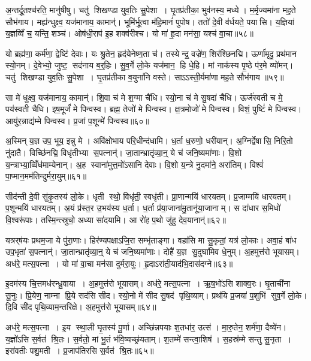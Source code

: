 अ॒न्तर्दू॒तश्च॑रति॒ मानु॑षीषु। चतु॑ शिखण्डा युव॒तिः सु॒पेशा। घृ॒तप्र॑तीका॒ भुव॑नस्य॒ मध्ये। म॒र्मृ॒ज्यमा॑ना मह॒ते सौभ॑गाय। मह्य॑न्धुक्ष्व॒ यज॑मानाय॒ कामान्॑। भूमि॑र्भू॒त्वा म॑हि॒मानं॑ पुपोष। ततो॑ दे॒वी व॑र्धयते॒ पयासि। य॒ज्ञिया॑ य॒ज्ञव्विँ च॒ यन्ति॒ शञ्च॑। ओष॑धी॒राप॑ इ॒ह शक्व॑रीश्च। यो मा॑ हृ॒दा मन॑सा॒ यश्च॑ वा॒चा॥५८॥

यो ब्रह्म॑णा॒ कर्म॑णा॒ द्वेष्टि॑ देवाः। यः श्रु॒तेन॒ हृद॑येनेष्ण॒ता च॑। तस्येन्द्र॒ वज्रे॑ण॒ शिर॑श्छिनद्मि। ऊर्णा॑मृदु॒ प्रथ॑मान स्यो॒नम्। दे॒वेभ्यो॒ जुष्ट॒ सद॑नाय ब॒र्॒हिः। सु॒व॒र्गे लो॒के यज॑मान॒ हि धे॒हि। मां नाक॑स्य पृ॒ष्ठे प॑र॒मे व्यो॑मन्। चतु॑ शिखण्डा युव॒तिः सु॒पेशा। घृ॒तप्र॑तीका व॒युना॑नि वस्ते। साऽऽस्ती॒र्यमा॑णा मह॒ते सौभ॑गाय ॥५९॥

सा मे॑ धुक्ष्व॒ यज॑मानाय॒ कामान्॑। शि॒वा च॑ मे श॒ग्मा चै॑धि। स्यो॒ना च॑ मे सु॒षदा॑ चैधि। ऊर्ज॑स्वती च मे॒ पय॑स्वती चैधि। इष॒मूर्जं॑ मे पिन्वस्व। ब्रह्म॒ तेजो॑ मे पिन्वस्व। क्ष॒त्रमोजो॑ मे पिन्वस्व। विशं॒ पुष्टिं॑ मे पिन्वस्व। आयु॑र॒न्नाद्य॑म्मे पिन्वस्व। प्र॒जां प॒शून्मे॑ पिन्वस्व॥६०॥

अ॒स्मिन् य॒ज्ञ उप॒ भूय॒ इन्नु मे। अवि॑क्षोभाय परि॒धीन्द॑धामि। ध॒र्ता ध॒रुणो॒ धरी॑यान्। अ॒ग्निर्द्वेषासि॒ निरि॒तो नु॑दातै। विच्छि॑नद्मि॒ विधृ॑तीभ्या स॒पत्नान्॑। जा॒तान्भ्रातृ॑व्या॒न्॒ ये च॑ जनि॒ष्यमा॑णाः। वि॒शो य॒न्त्राभ्या॒व्विँध॑माम्येनान्। अ॒ह स्वाना॑मुत्त॒मो॑ऽसानि देवाः। वि॒शो य॒न्त्रे नु॒दमा॑ने॒ अरा॑तिम्। विश्वं॑ पा॒प्मान॒मम॑तिन्दुर्मरा॒युम्॥६१॥

सीद॑न्ती दे॒वी सु॑कृ॒तस्य॑ लो॒के। धृती स्थो॒ विधृ॑ती॒ स्वधृ॑ती। प्रा॒णान्मयि॑ धारयतम्। प्र॒जाम्मयि॑ धारयतम्। प॒शून्मयि॑ धारयतम्। अ॒यं प्र॑स्त॒र उ॒भय॑स्य ध॒र्ता। ध॒र्ता प्र॑या॒जाना॑मु॒तानू॑या॒जानाम्। स दा॑धार स॒मिधो॑ वि॒श्वरू॑पाः। तस्मि॒न्त्स्रुचो॒ अध्या सा॑दयामि। आ रो॑ह प॒थो जु॑हु देव॒यानान्॑॥६२॥

यत्रर्‌ष॑यः प्रथम॒जा ये पु॑रा॒णाः। हिर॑ण्यपक्षाऽजि॒रा सम्भृ॑ताङ्गा। वहा॑सि मा सु॒कृतां॒ यत्र॑ लो॒काः। अवा॒हं बा॑ध उप॒भृता॑ स॒पत्नान्॑। जा॒तान्भ्रातृ॑व्या॒न्॒ ये च॑ जनि॒ष्यमा॑णाः। दोहै॑ य॒ज्ञ सु॒दुघा॑मिव धे॒नुम्। अ॒हमुत्त॑रो भूयासम्। अध॑रे॒ मत्स॒पत्ना। यो मा॑ वा॒चा मन॑सा दुर्मरा॒युः। हृ॒दाऽरा॑ती॒याद॑भि॒दास॑दग्ने॥६३॥

इ॒दम॑स्य चि॒त्तमध॑रन्ध्रु॒वाया। अ॒हमुत्त॑रो भूयासम्। अध॑रे॒ मत्स॒पत्ना। ऋ॒ष॒भो॑ऽसि शाक्व॒रः। घृ॒ताची॑ना सू॒नुः। प्रि॒येण॒ नाम्ना प्रि॒ये सद॑सि सीद। स्यो॒नो मे॑ सीद सु॒षद॑ पृथि॒व्याम्। प्रथ॑यि प्र॒जया॑ प॒शुभि॑ सुव॒र्गे लो॒के। दि॒वि सी॑द पृथि॒व्याम॒न्तरि॑क्षे। अ॒हमुत्त॑रो भूयासम्॥६४॥

अध॑रे॒ मत्स॒पत्ना। इ॒य स्था॒ली घृ॒तस्य॑ पू॒र्णा। अच्छि॑न्नपयाः श॒तधा॑र॒ उत्स॑। मा॒रु॒तेन॒ शर्म॑णा॒ दैव्ये॑न। य॒ज्ञो॑ऽसि स॒र्वत॑ श्रि॒तः। स॒र्वतो॒ मां भू॒तं भ॑वि॒ष्यच्छ्र॑यताम्। श॒तम्मे॑ सन्त्वा॒शिष॑। स॒हस्र॑म्मे सन्तु सू॒नृता। इरा॑वतीः पशु॒मती। प्र॒जाप॑तिरसि स॒र्वत॑ श्रि॒तः॥६५॥

